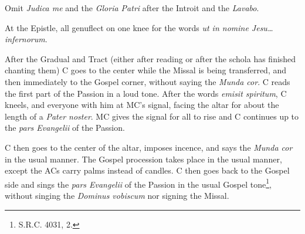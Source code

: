 {	\rubric Omit \textit{Judica me} and the \textit{Gloria Patri} after the
	Introit and the \textit{Lavabo}.

	\rubric At the Epistle, all genuflect on one knee for the words \textit{ut
	in nomine Jesu\dots infernorum}.

	\rubric After the Gradual and Tract (either after reading or after the
	schola has finished chanting them) C goes to the center while the Missal is
	being transferred, and then immediately to the Gospel corner, without
	saying the \textit{Munda cor}. C reads the first part of the Passion in a
	loud tone. After the words \textit{emisit spiritum}, C kneels, and everyone
	with him at MC's signal, facing the altar for about the length of a
	\textit{Pater noster}. MC gives the signal for all to rise and C continues
	up to the \textit{pars Evangelii} of the Passion. 

	\rubric C then goes to the center of the altar, imposes incence, and says
	the \textit{Munda cor} in the usual manner. The Gospel procession takes
	place in the usual manner, except the ACs carry palms instead of candles. C
	then goes back to the Gospel side and sings the \textit{pars Evangelii} of
	the Passion in the usual Gospel tone\footnote{S.R.C. 4031, 2.}, without
	singing the \textit{Dominus vobiscum} nor signing the Missal.

	}
